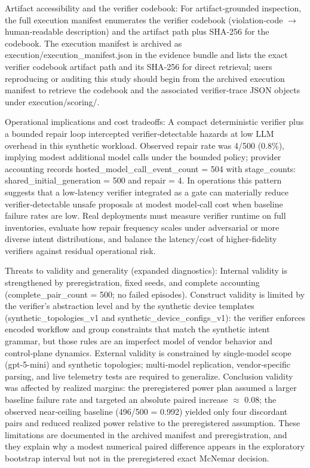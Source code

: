 \documentclass[conference]{IEEEtran}
\begin{document}
Artifact accessibility and the verifier codebook: For artifact‑grounded inspection, the full execution manifest enumerates the verifier codebook (violation‑code \ensuremath{\rightarrow} human‑readable description) and the artifact path plus SHA‑256 for the codebook. The execution manifest is archived as execution/execution\_manifest.json in the evidence bundle and lists the exact verifier codebook artifact path and its SHA‑256 for direct retrieval; users reproducing or auditing this study should begin from the archived execution manifest to retrieve the codebook and the associated verifier‑trace JSON objects under execution/scoring/.

Operational implications and cost tradeoffs: A compact deterministic verifier plus a bounded repair loop intercepted verifier‑detectable hazards at low LLM overhead in this synthetic workload. Observed repair rate was 4/500 (0.8\%), implying modest additional model calls under the bounded policy; provider accounting records hosted\_model\_call\_event\_count = 504 with stage\_counts: shared\_initial\_generation = 500 and repair = 4. In operations this pattern suggests that a low‑latency verifier integrated as a gate can materially reduce verifier‑detectable unsafe proposals at modest model‑call cost when baseline failure rates are low. Real deployments must measure verifier runtime on full inventories, evaluate how repair frequency scales under adversarial or more diverse intent distributions, and balance the latency/cost of higher‑fidelity verifiers against residual operational risk.

Threats to validity and generality (expanded diagnostics): Internal validity is strengthened by preregistration, fixed seeds, and complete accounting (complete\_pair\_count = 500; no failed episodes). Construct validity is limited by the verifier's abstraction level and by the synthetic device templates (synthetic\_topologies\_v1 and synthetic\_device\_configs\_v1): the verifier enforces encoded workflow and group constraints that match the synthetic intent grammar, but those rules are an imperfect model of vendor behavior and control‑plane dynamics. External validity is constrained by single‑model scope (gpt-5-mini) and synthetic topologies; multi‑model replication, vendor‑specific parsing, and live telemetry tests are required to generalize. Conclusion validity was affected by realized margins: the preregistered power plan assumed a larger baseline failure rate and targeted an absolute paired increase \ensuremath{\approx} 0.08; the observed near‑ceiling baseline (496/500 = 0.992) yielded only four discordant pairs and reduced realized power relative to the preregistered assumption. These limitations are documented in the archived manifest and preregistration, and they explain why a modest numerical paired difference appears in the exploratory bootstrap interval but not in the preregistered exact McNemar decision.
\end{document}
